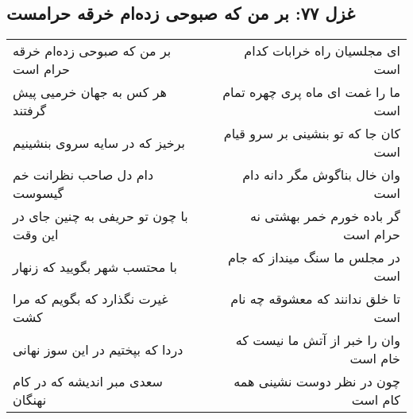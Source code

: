 \begin{center}
\section*{غزل ۷۷: بر من که صبوحی زده‌ام خرقه حرامست}
\label{sec:077}
\begin{longtable}{l p{0.5cm} r}
بر من که صبوحی زده‌ام خرقه حرام است
&&
ای مجلسیان راه خرابات کدام است
\\
هر کس به جهان خرمیی پیش گرفتند
&&
ما را غمت ای ماه پری چهره تمام است
\\
برخیز که در سایه سروی بنشینیم
&&
کان جا که تو بنشینی بر سرو قیام است
\\
دام دل صاحب نظرانت خم گیسوست
&&
وان خال بناگوش مگر دانه دام است
\\
با چون تو حریفی به چنین جای در این وقت
&&
گر باده خورم خمر بهشتی نه حرام است
\\
با محتسب شهر بگویید که زنهار
&&
در مجلس ما سنگ مینداز که جام است
\\
غیرت نگذارد که بگویم که مرا کشت
&&
تا خلق ندانند که معشوقه چه نام است
\\
دردا که بپختیم در این سوز نهانی
&&
وان را خبر از آتش ما نیست که خام است
\\
سعدی مبر اندیشه که در کام نهنگان
&&
چون در نظر دوست نشینی همه کام است
\\
\end{longtable}
\end{center}
